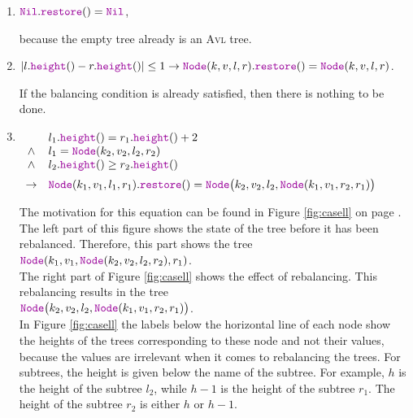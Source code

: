 \begin{enumerate}
\item $\mytt{Nil}.\mytt{restore}() = \mytt{Nil}$,

      because the empty tree already is an  \textsc{Avl} tree.
\item $|l.\mytt{height}() - r.\mytt{height}()| \leq 1 \rightarrow 
       \mytt{Node}(k,v,l,r).\mytt{restore}() = \mytt{Node}(k,v,l,r)$.

      If the balancing condition is already satisfied, then there is nothing to be done. 
\item $\begin{array}[t]{cl}
              & l_1.\mytt{height}() = r_1.\mytt{height}() + 2    \\ 
       \wedge & l_1 = \mytt{Node}(k_2,v_2,l_2,r_2)                 \\
       \wedge & l_2.\mytt{height}() \geq r_2.\mytt{height}()     \\[0.2cm]
       \rightarrow & \mytt{Node}(k_1,v_1,l_1,r_1).\mytt{restore}() = 
                     \mytt{Node}\bigl(k_2,v_2,l_2,\mytt{Node}(k_1,v_1,r_2,r_1)\bigr)
       \end{array}
      $

      The motivation for this equation can be found in Figure \ref{fig:casell}
      on page \pageref{fig:casell}.  The left part of this figure shows the state
      of the tree before it has been rebalanced.  Therefore, this part shows the tree
      \\[0.2cm]
      \hspace*{1.3cm}
      $\mytt{Node}(k_1,v_1, \mytt{Node}(k_2,v_2,l_2,r_2), r_1)$. 
      \\[0.2cm]
      The right part of Figure \ref{fig:casell} shows the effect of rebalancing.  
      This rebalancing results in the tree
      \\[0.2cm]
      \hspace*{1.3cm}
      $\mytt{Node}\bigl(k_2,v_2,l_2,\mytt{Node}(k_1,v_1,r_2,r_1)\bigr)$.
      \\[0.2cm]
      In Figure \ref{fig:casell} the labels below the horizontal line of each node show the heights
      of the trees corresponding to these node and not their values, because the values are irrelevant when it comes
      to rebalancing the trees.  For subtrees, the height is given below the name of
      the subtree.  For example,  $h$ is the height of the subtree 
      $l_2$, while $h-1$ is the height of the subtree $r_1$. The height of the subtree $r_2$
      is either $h$ or $h-1$.


\end{enumerate}

